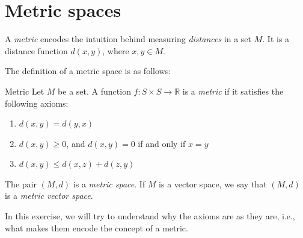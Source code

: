 \documentclass[12pt]{report}
\begin{document}
\section{Metric spaces}

A \emph{metric} encodes the intuition behind measuring \emph{distances} in a set $M$. It is a distance function $d(x,y)$, where $x,y\in M$.

The definition of a metric space is as follows:
\begin{myDefinitionx}{Metric}{}
    Let $M$ be a set. A function $f: S\times S \to \mathbb{R}$ is a \emph{metric} if it satisfies the following axioms:
    \begin{enumerate}
        \item $d(x,y) = d(y,x)$ 
        \item $d(x,y) \geq 0$, and $d(x,y) = 0$ if and only if $x =y$ 
        \item $d(x,y) \leq d(x,z) + d(z,y)$ 
    \end{enumerate}
    The pair $(M,d)$ is a \emph{metric space}. If $M$ is a vector space, we say that $(M,d)$ is a \emph{metric vector space}.
\end{myDefinitionx}
In this exercise, we will try to understand why the axioms are as they are, i.e., what makes them encode the concept of a metric.
\end{document}

